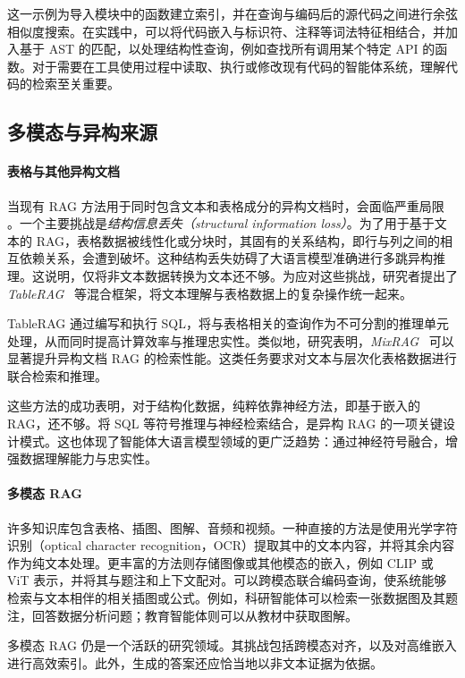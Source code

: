 这一示例为导入模块中的函数建立索引，并在查询与编码后的源代码之间进行余弦相似度搜索。在实践中，可以将代码嵌入与标识符、注释等词法特征相结合，并加入基于 AST 的匹配，以处理结构性查询，例如查找所有调用某个特定 API 的函数。对于需要在工具使用过程中读取、执行或修改现有代码的智能体系统，理解代码的检索至关重要。


\subsection{多模态与异构来源}

\paragraph{表格与其他异构文档} 当现有 RAG 方法用于同时包含文本和表格成分的异构文档时，会面临严重局限 \citep{yu2025tableragretrievalaugmentedgeneration}。一个主要挑战是\textit{结构信息丢失（structural information loss）}。为了用于基于文本的 RAG，表格数据被线性化或分块时，其固有的关系结构，即行与列之间的相互依赖关系，会遭到破坏。这种结构丢失妨碍了大语言模型准确进行多跳异构推理。这说明，仅将非文本数据转换为文本还不够。为应对这些挑战，研究者提出了 \emph{TableRAG}~\citep{yu2025tableragretrievalaugmentedgeneration} 等混合框架，将文本理解与表格数据上的复杂操作统一起来。

TableRAG 通过编写和执行 SQL，将与表格相关的查询作为不可分割的推理单元处理，从而同时提高计算效率与推理忠实性。类似地，研究表明，\emph{MixRAG}~\citep{zhang2025mixtureofragintegratingtexttables} 可以显著提升异构文档 RAG 的检索性能。这类任务要求对文本与层次化表格数据进行联合检索和推理。

这些方法的成功表明，对于结构化数据，纯粹依靠神经方法，即基于嵌入的 RAG，还不够。将 SQL 等符号推理与神经检索结合，是异构 RAG 的一项关键设计模式。这也体现了智能体大语言模型领域的更广泛趋势：通过神经符号融合，增强数据理解能力与忠实性。

\paragraph{多模态 RAG} 许多知识库包含表格、插图、图解、音频和视频。一种直接的方法是使用光学字符识别（optical character recognition，OCR）提取其中的文本内容，并将其余内容作为纯文本处理。更丰富的方法则存储图像或其他模态的嵌入，例如 CLIP 或 ViT 表示，并将其与题注和上下文配对。可以跨模态联合编码查询，使系统能够检索与文本相伴的相关插图或公式。例如，科研智能体可以检索一张数据图及其题注，回答数据分析问题；教育智能体则可以从教材中获取图解。

多模态 RAG 仍是一个活跃的研究领域。其挑战包括跨模态对齐，以及对高维嵌入进行高效索引。此外，生成的答案还应恰当地以非文本证据为依据。


